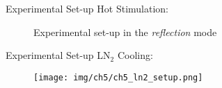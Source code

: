 \begin{frame}{Experimental Set-up}
    Hot Stimulation:
    \begin{figure}
        \centering
       \caption{Experimental set-up in the \textit{reflection} mode}
    \end{figure}

\end{frame}


\begin{frame}{Experimental Set-up}
    LN$_2$ Cooling:
    \begin{figure}
        \centering
        \texttt{[image: img/ch5/ch5\_ln2\_setup.png]}
    \end{figure}

\end{frame}







